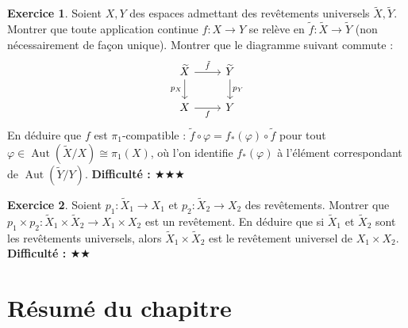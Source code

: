 \documentclass[12pt,a4paper,openany]{book}
\theoremstyle{definition}
\newtheorem{exercice}{Exercice}[chapter]
\theoremstyle{plain}
\theoremstyle{remark}
\DeclareMathOperator{\Aut}{Aut}
\begin{document}
\begin{exercice}\label{exo:functorialite-rev}
Soient $X, Y$ des espaces admettant des revêtements universels $\widetilde{X}, \widetilde{Y}$.
Montrer que toute application continue $f \colon X \to Y$ se relève en
$\tilde{f} \colon \widetilde{X} \to \widetilde{Y}$ (non nécessairement de façon unique).
Montrer que le diagramme suivant commute :
\[
\begin{tikzcd}
\widetilde{X} \arrow[r, "\tilde{f}"] \arrow[d, "p_X"'] & \widetilde{Y} \arrow[d, "p_Y"] \\
X \arrow[r, "f"'] & Y
\end{tikzcd}
\]
En déduire que $f$ est $\pi_1$-compatible :
$\tilde{f} \circ \varphi = f_*(\varphi) \circ \tilde{f}$ pour tout $\varphi \in \Aut(\widetilde{X}/X) \cong \pi_1(X)$,
où l'on identifie $f_*(\varphi)$ à l'élément correspondant de $\Aut(\widetilde{Y}/Y)$.
\textbf{Difficulté : \(\bigstar\bigstar\bigstar\)}
\end{exercice}

\begin{exercice}\label{exo:rev-produit}
Soient $p_1 \colon \widetilde{X}_1 \to X_1$ et $p_2 \colon \widetilde{X}_2 \to X_2$ des revêtements.
Montrer que $p_1 \times p_2 \colon \widetilde{X}_1 \times \widetilde{X}_2 \to X_1 \times X_2$ est un revêtement.
En déduire que si $\widetilde{X}_1$ et $\widetilde{X}_2$ sont les revêtements universels,
alors $\widetilde{X}_1 \times \widetilde{X}_2$ est le revêtement universel de $X_1 \times X_2$.
\textbf{Difficulté : \(\bigstar\bigstar\)}
\end{exercice}

\section*{Résumé du chapitre}\label{sec:resume-ch4}
\end{document}

